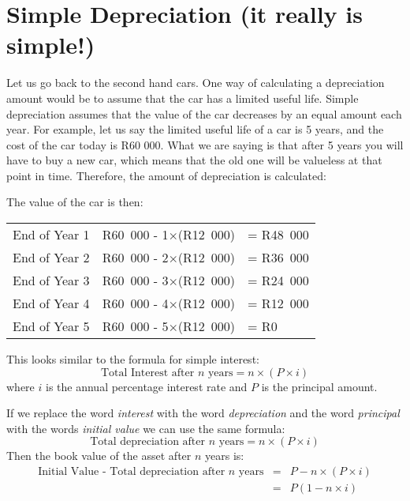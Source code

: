 
\section{Simple Depreciation (it really is simple!)}
Let us go back to the second hand cars. One way of calculating a depreciation amount would be to assume that the car has a limited useful life. Simple depreciation assumes that the value of the car decreases by an equal amount each year. For example, let us say the limited useful life of a car is 5 years, and the cost of the car today is R60 000. What we are saying is that after 5 years you will have to buy a new car, which means that the old one will be valueless at that point in time. Therefore, the amount of depreciation is calculated:

The value of the car is then:
\begin{center}
\begin{tabular}{ccl}
End of Year 1&R60~000 - 1$\times$(R12~000)&= R48~000\\
End of Year 2&R60~000 - 2$\times$(R12~000)&= R36~000\\
End of Year 3&R60~000 - 3$\times$(R12~000)&= R24~000\\
End of Year 4&R60~000 - 4$\times$(R12~000)&= R12~000\\
End of Year 5&R60~000 - 5$\times$(R12~000)&= R0\\
\end{tabular}
\end{center}
This looks similar to the formula for simple interest:
\begin{equation*}
\mbox{Total Interest after $n$ years} = n \times (P \times i)
\end{equation*}
where $i$ is the annual percentage interest rate and $P$ is the principal amount.

If we replace the word \textit{interest} with the word \textit{depreciation} and the word \textit{principal} with the words \textit{initial value} we can use the same formula:
\begin{equation*}
\mbox{Total depreciation after $n$ years} = n \times (P \times i)
\end{equation*}
Then the book value of the asset after $n$ years is:
\begin{eqnarray*}
\mbox{Initial Value - Total depreciation after $n$ years} &=& P - n \times (P \times i)\\
&=&P(1-n\times i)
\end{eqnarray*}

